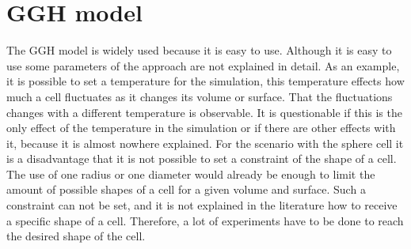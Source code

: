 \section{GGH model}
The \ac{GGH} model is widely used because it is easy to use. Although it is easy to use some parameters of the approach are not explained in detail. As an example, it is possible to set a temperature for the simulation, this temperature effects how much a cell fluctuates as it changes its volume or surface. That the fluctuations changes with a different temperature is observable. It is questionable if this is the only effect of the temperature in the simulation or if there are other effects with it, because it is almost nowhere explained.  \newline
For the scenario with the sphere cell it is a disadvantage that it is not possible to set a constraint of the shape of a cell. The use of one radius or one diameter would already be enough to limit the amount of possible shapes of a cell for a given volume and surface. Such a constraint can not be set, and it is not explained in the literature how to receive a specific shape of a cell. Therefore, a lot of experiments have to be done to reach the desired shape of the cell.